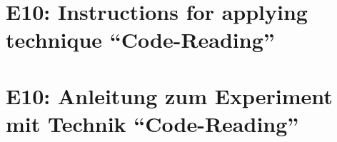 
\ifenglish
\section*{E10: Instructions for applying technique ``Code-Reading''}

\fi
\ifgerman
\section*{E10: Anleitung zum Experiment mit Technik "`Code-Reading"'}

\fi

